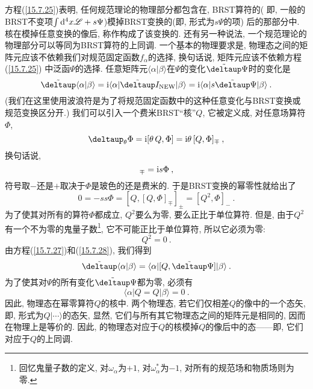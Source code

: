方程(\ref{15.7.25})表明, 任何规范理论的物理部分都包含在, BRST算符的{}(%
即, 一般的BRST不变项$\int \dif^{4}x%
\mathscr{L}+s\Psi $)模掉BRST变换的{}(即, 形式为$s\Psi $的项)%
后的那部分中. 核在模掉任意变换的像后, 称作构成了该变换的{}. 还有另一种说法, 一个规范理论的物理部分可以等同为BRST算符的上同调.\cite{12} 一个基本的物理要求是, 物理态之间的矩阵元应该不依赖我们对规范固定函数$f_{\alpha }$的选择, 换句话说, 矩阵元应该不依赖方程(\ref{15.7.25})%
中泛函$\Psi $的选择. 任意矩阵元$\langle \alpha |\beta
\rangle $在$\Psi $的变化$\tilde{\deltaup}\Psi$时的变化是
\begin{equation}
\tilde{\deltaup}\langle \alpha |\beta \rangle =\mi\langle \alpha |\tilde{\deltaup}%
I_{\mathrm{NEW}}|\beta \rangle =\mi\langle \alpha |s\tilde{\deltaup}\Psi |\beta \rangle
\:.   \label{15.7.27}
\end{equation}
(我们在这里使用波浪符是为了将规范固定函数中的这种任意变化与BRST变换或规范变换区分开.) 我们可以引入一个费米BRST``核''$Q$, 它被定义成, 对任意场算符$\Phi$,
\[
\deltaup_{\theta} \Phi = \mi[\theta\,Q , \Phi] = \mi\theta\,[Q,\Phi]_{\mp} \:, 
\]
换句话说,
\begin{equation}
[Q,\Phi]_{\mp}=\mi s\Phi \:,  \label{15.7.28}
\end{equation}
符号取$-$还是$+$取决于$\Phi$是玻色的还是费米的. 于是BRST变换的幂零性就给出了
\[
0=-ss\Phi=[Q,[Q,\Phi]_{\mp}]_{\pm}=[Q^{2},\Phi]_{-} \:. 
\]
为了使其对所有的算符$\Phi $都成立, $Q^{2}$要么为零, 要么正比于单位算符. 但是, 由于$Q^{2}$有一个不为零的鬼量子数\footnote{回忆鬼量子数的定义, 对$\omega _{\alpha }$为$+1$, 对$\omega _{\alpha }^{\ast }$为$-1$, 对所有的规范场和物质场则为零.}, 它不可能正比于单位算符, 所以它必须为零:%
\begin{equation}
Q^{2}=0\:.   \label{15.7.29}
\end{equation}%
由方程(\ref{15.7.27})和(\ref{15.7.28}), 我们得到
\begin{equation}
\tilde{\deltaup}\langle \alpha |\beta \rangle =\langle \alpha |[Q,\tilde{\deltaup%
}\Psi ]|\beta \rangle \:.   \label{15.7.30}
\end{equation}%
为了使其对$\Psi $的所有变化$\tilde{\deltaup}\Psi$都为零, 必须有
\begin{equation}
\langle \alpha |Q=Q|\beta \rangle =0\:.   \label{15.7.31}
\end{equation}%
因此, 物理态在幂零算符$Q$的核中. 两个物理态, 若它们仅相差$Q$的像中的一个态矢, 即, 形式为$%
Q|\cdots \rangle $的态矢, 显然, 它们与所有其它物理态之间的矩阵元是相同的, 因而在物理上是等价的.
因此, {}的物理态对应于$Q$的核模掉$Q$的像后中的态------即, 它们对应于$Q$的上同调.

